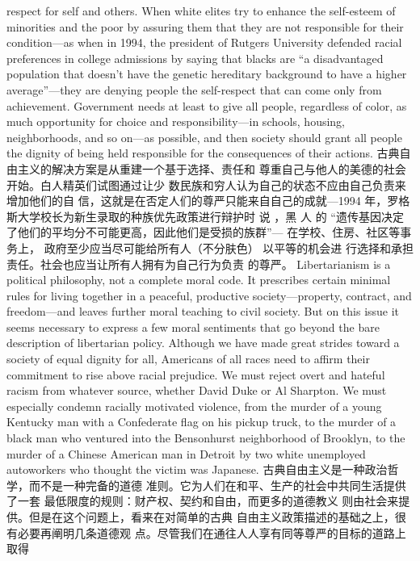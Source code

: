\begin{paracol}{2}
respect for self and others. When white elites try to enhance the
self-esteem of minorities and the poor by assuring them that
they are not responsible for their condition---as when in 1994,
the president of Rutgers University defended racial preferences
in college admissions by saying that blacks are ``a disadvantaged population that doesn't have the genetic hereditary background to have a higher average''---they are denying people the
self-respect that can come only from achievement. Government
needs at least to give all people, regardless of color, as much opportunity for choice and responsibility---in schools, housing,
neighborhoods, and so on---as possible, and then society should
grant all people the dignity of being held responsible for the
consequences of their actions.
\switchcolumn
古典自由主义的解决方案是从重建一个基于选择、责任和
尊重自己与他人的美德的社会开始。白人精英们试图通过让少
数民族和穷人认为自己的状态不应由自己负责来增加他们的自
信，这就是在否定人们的尊严只能来自自己的成就---1994
年，罗格斯大学校长为新生录取的种族优先政策进行辩护时
说 ，黑 人 的 “遗传基因决定了他们的平均分不可能更高，因此他们是受损的族群”--- 在学校、住房、社区等事务上，
政府至少应当尽可能给所有人（不分肤色） 以平等的机会进
行选择和承担责任。社会也应当让所有人拥有为自己行为负责
的尊严。
\switchcolumn*
Libertarianism is a political philosophy, not a complete moral
code. It prescribes certain minimal rules for living together in a
peaceful, productive society---property, contract, and freedom---and leaves further moral teaching to civil society. But on
this issue it seems necessary to express a few moral sentiments
that go beyond the bare description of libertarian policy. Although we have made great strides toward a society of equal dignity for all, Americans of all races need to affirm their commitment to rise above racial prejudice. We must reject overt
and hateful racism from whatever source, whether David Duke
or Al Sharpton. We must especially condemn racially motivated
violence, from the murder of a young Kentucky man with a
Confederate flag on his pickup truck, to the murder of a black
man who ventured into the Bensonhurst neighborhood of
Brooklyn, to the murder of a Chinese American man in Detroit
by two white unemployed autoworkers who thought the victim
was Japanese.
\switchcolumn
古典自由主义是一种政治哲学，而不是一种完备的道德
准则。它为人们在和平、生产的社会中共同生活提供了一套
最低限度的规则：财产权、契约和自由，而更多的道德教义
则由社会来提供。但是在这个问题上，看来在对简单的古典
自由主义政策描述的基础之上，很有必要再阐明几条道德观
点。尽管我们在通往人人享有同等尊严的目标的道路上取得

\end{paracol}
